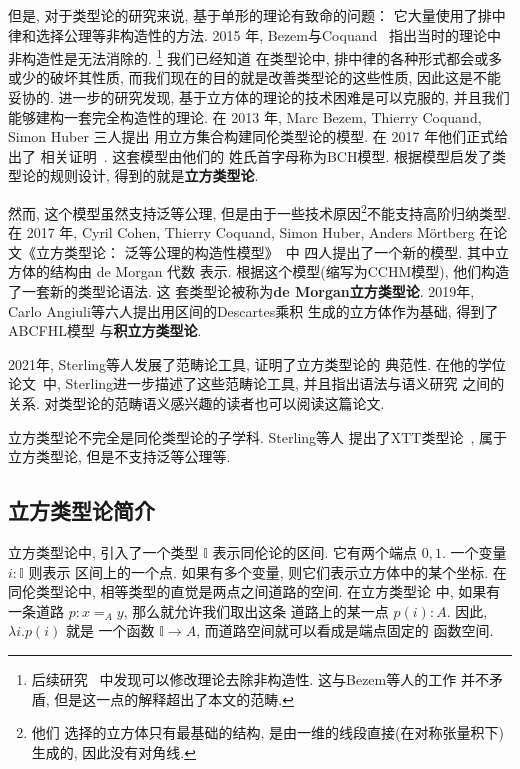 但是, 对于类型论的研究来说, 基于单形的理论有致命的问题：
它大量使用了排中律和选择公理等非构造性的方法. 2015
年, Bezem与Coquand~\cite{bezem:2015:simplicial}
指出当时的理论中非构造性是无法消除的.%
\footnote{后续研究~\cite{henry:2019:constructive}
中发现可以修改理论去除非构造性. 这与Bezem等人的工作
并不矛盾, 但是这一点的解释超出了本文的范畴.} 我们已经知道
在类型论中, 排中律的各种形式都会或多或少的破坏其性质,
而我们现在的目的就是改善类型论的这些性质, 因此这是不能妥协的.
进一步的研究发现, 基于立方体的理论的技术困难是可以克服的,
并且我们能够建构一套完全构造性的理论. 在 2013 年,
Marc Bezem, Thierry Coquand, Simon Huber 三人提出
用立方集合构建同伦类型论的模型. 在 2017 年他们正式给出了
相关证明~\cite{bch:2017:cubical}. 这套模型由他们的
姓氏首字母称为BCH模型. 根据模型启发了类型论的规则设计,
得到的就是\textbf{立方类型论}.

然而, 这个模型虽然支持泛等公理, 但是由于一些技术原因\footnote{他们
选择的立方体只有最基础的结构, 是由一维的线段直接(在对称张量积下)生成的,
因此没有对角线.}不能支持高阶归纳类型. 在 2017 年,
Cyril Cohen, Thierry Coquand, Simon Huber, Anders M\"ortberg
在论文《立方类型论： 泛等公理的构造性模型》~\cite{abcfhl:2021:cubical}中
四人提出了一个新的模型. 其中立方体的结构由 de Morgan 代数
表示. 根据这个模型(缩写为CCHM模型), 他们构造了一套新的类型论语法. 这
套类型论被称为\textbf{de Morgan立方类型论}.
2019年, Carlo Angiuli等六人提出用区间的Descartes乘积
生成的立方体作为基础, 得到了ABCFHL模型
与\textbf{积立方类型论}.

2021年, Sterling等人发展了范畴论工具, 证明了立方类型论的
典范性. 在他的学位论文~\cite{sterling:2021:thesis}中,
Sterling进一步描述了这些范畴论工具, 并且指出语法与语义研究
之间的关系. 对类型论的范畴语义感兴趣的读者也可以阅读这篇论文.

立方类型论不完全是同伦类型论的子学科. Sterling等人
提出了XTT类型论~\cite{sterling:2019:xtt}, 属于立方类型论,
但是不支持泛等公理等.

\subsection{立方类型论简介}

立方类型论中, 引入了一个类型 \(\mathbb I\) 表示同伦论的区间.
它有两个端点 \(0,1\). 一个变量 \(i : \mathbb I\) 则表示
区间上的一个点. 如果有多个变量, 则它们表示立方体中的某个坐标.
在同伦类型论中, 相等类型的直觉是两点之间道路的空间. 在立方类型论
中, 如果有一条道路 \(p : x =_A y\), 那么就允许我们取出这条
道路上的某一点 \(p(i) : A\). 因此, \(\lambda i. p(i)\) 就是
一个函数 \(\mathbb I \to A\), 而道路空间就可以看成是端点固定的
函数空间.

